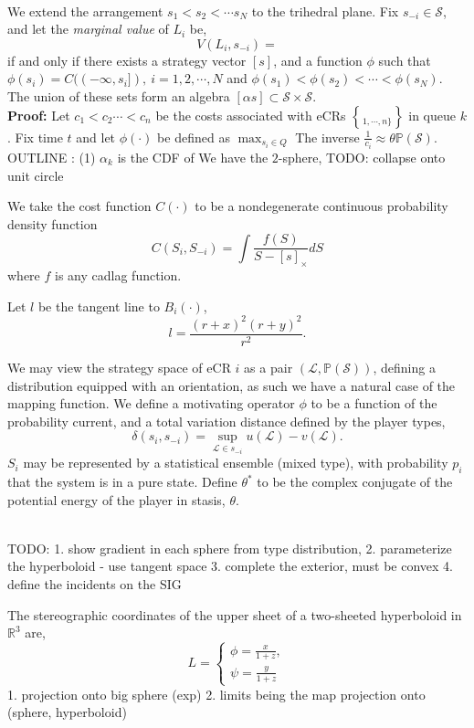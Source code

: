 \documentclass[10pt]{article}
\newcommand{\mcL}{\mathcal{L}}
\newcommand{\mcS}{\mathcal{S}}
\theoremstyle{definition}
\begin{document}
{{\\
We extend the arrangement $s_1<s_2<\cdots s_N$ to the trihedral plane. Fix
$s_{-i}\in \mcS$, and let the \emph{marginal value} of $L_i$ be,
$$
    V(L_i,s_{-i}) = 
$$
if and only if there exists a strategy vector $[s]$, and a function $\phi$ such
that $\phi(s_i) =
C((-\infty,s_i]), \ i = 1,2,\cdots, N$ and $\phi(s_1) <
\phi(s_2) < \cdots < \phi(s_N)$. The union of these sets form an
algebra $[\alpha s] \subset \mcS\times\mcS$.
}\\
\textbf{Proof:} 
Let $c_1 < c_2 \cdots < c_n$ be the costs associated with eCRs $\brace 1,\cdots,
n\rbrace$ in queue $k$. Fix time $t$ and let $\phi(\cdot)$ be defined as
$\max_{s_i\in Q}$ The inverse $\frac{1}{c_i} \approx 
\theta\mathbb{P(\mcS)}$.
OUTLINE : (1) $\alpha_k$ is the CDF of 
We have the $2$-sphere, TODO: collapse onto unit circle

We take the cost function $C(\cdot)$ to be a nondegenerate
continuous probability density function
$$
    C(S_i,S_{-i}) = \int \frac{f(S)}{S - [s]_\times} dS
$$
where $f$ is any cadlag function.

Let $l$ be the tangent line to $B_i(\cdot)$,
$$
    l = \frac{(r+x)^2(r+y)^2}{r^2}.
$$

We may view the strategy space of eCR $i$ as a pair $(\mcL, \mathbb{P}(\mcS))$,
defining a distribution equipped with an orientation, as such we have a natural
case of the mapping function. 
We define a motivating operator $\phi$ to be a function of the probability
current, and a total variation distance defined by the player types,
$$
    \delta(s_i,s_{-i}) = \sup\limits_{\mcL \in s_{-i}} u(\mcL) - v(\mcL).
$$
$S_i$ may be represented by a statistical
ensemble (mixed type), with probability $p_i$ that the system is in a pure
state.
Define $\theta^*$ to be the complex
conjugate of the potential energy of the player in stasis, $\theta$.

{\\ 
}
TODO: 
1. show gradient in each sphere from type distribution,
2. parameterize the hyperboloid
- use tangent space
3. complete the exterior, must be convex
4. define the incidents on the SIG


The stereographic coordinates of the upper sheet of a two-sheeted hyperboloid
in $\mathbb{R}^3$ are,
$$
    L = 
    \begin{cases}
    \phi = \frac{x}{1+z},\\
    \psi = \frac{y}{1+z}
    \end{cases}
$$
1. projection onto big sphere (exp)
2. limits being the map projection onto (sphere, hyperboloid)



}
\end{document}
